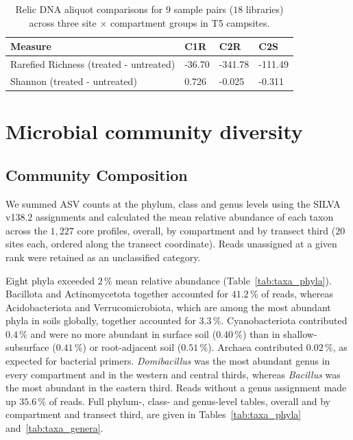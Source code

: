 \documentclass[11pt]{article}
\begin{document}
\begin{table}[htbp]
\centering
\caption{Relic DNA aliquot comparisons for $9$ sample pairs ($18$ libraries) across three site $\times$ compartment groups in T5 campsites.}
\label{tab:relicresults}
\begin{tabular}{llll}
\hline
Measure                        & C1R    & C2R     & C2S     \\ \hline
Rarefied Richness (treated - untreated) & -36.70 & -341.78 & -111.49 \\
Shannon (treated - untreated)  & 0.726  & -0.025  & -0.311  \\ \hline
\end{tabular}
\end{table}


\section{Microbial community diversity}
\subsection{Community Composition}\label{sup:composition}
We summed ASV counts at the phylum, class and genus levels using the SILVA
v138.2 assignments and calculated the mean relative abundance of each taxon
across the $1{,}227$ core profiles, overall, by compartment and by transect
third ($20$ sites each, ordered along the transect coordinate). Reads unassigned
at a given rank were retained as an unclassified category.

Eight phyla exceeded $2\,\%$ mean relative abundance
(Table~\ref{tab:taxa_phyla}). Bacillota and Actinomycetota together accounted
for $41.2\,\%$ of reads, whereas Acidobacteriota and Verrucomicrobiota, which
are among the most abundant phyla in soils globally, together accounted for
$3.3\,\%$. Cyanobacteriota contributed $0.4\,\%$ and were no more abundant in
surface soil ($0.40\,\%$) than in shallow-subsurface ($0.41\,\%$) or
root-adjacent soil ($0.51\,\%$). Archaea contributed $0.02\,\%$, as expected for
bacterial primers. \textit{Domibacillus} was the most abundant genus in every
compartment and in the western and central thirds, whereas \textit{Bacillus} was
the most abundant in the eastern third. Reads without a genus assignment made up
$35.6\,\%$ of reads. Full phylum-, class- and genus-level tables, overall and by
compartment and transect third, are given in Tables~\ref{tab:taxa_phyla}
and~\ref{tab:taxa_genera}.
\end{document}
